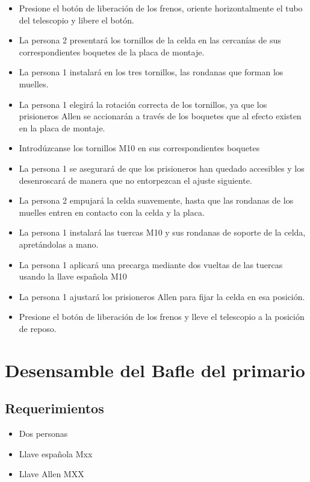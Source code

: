 \begin{itemize}
\item Presione el botón de liberación de los frenos, oriente horizontalmente el tubo del telescopio y libere el botón. 
\item La persona 2 presentará los tornillos de la celda en las cercanías de sus correspondientes boquetes de la placa de montaje.
\item La persona 1 instalará en los tres tornillos, las rondanas que forman los muelles.
\item La persona 1 elegirá la rotación correcta de los tornillos, ya que los prisioneros Allen se accionarán a través de los boquetes que al efecto existen en la placa de montaje.
\item Introdúzcanse los tornillos M10 en sus correspondientes boquetes 
\item La persona 1 se asegurará de que los prisioneros han quedado accesibles y los desenroscará de manera que no entorpezcan el ajuste siguiente. 
\item La persona 2 empujará la celda suavemente, hasta que las rondanas de los muelles entren en contacto con la celda y la placa.
\item La persona 1 instalará las tuercas M10 y sus rondanas de soporte de la celda, apretándolas a mano.
\item La persona 1 aplicará una precarga mediante dos vueltas de las tuercas usando la llave española M10
\item La persona 1 ajustará los prisioneros Allen para fijar la celda en esa posición.
\item Presione el botón de liberación de los frenos y lleve el telescopio a la posición de reposo.
\end{itemize}

\section{Desensamble del Bafle del primario}

\subsection{Requerimientos}

\begin{itemize}
\item Dos personas
\item Llave española Mxx
\item Llave Allen MXX
\end{itemize}

